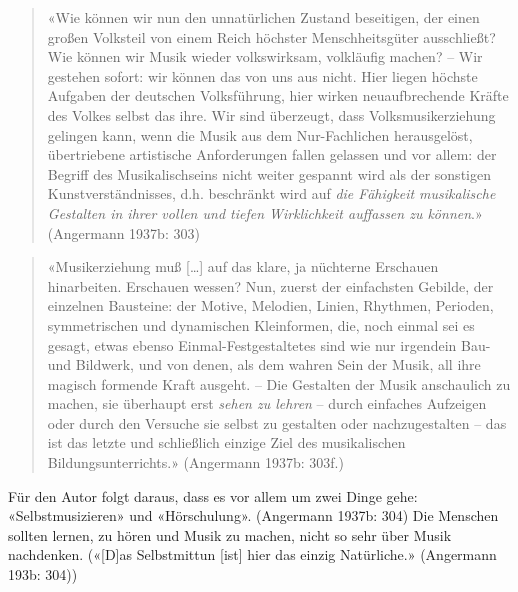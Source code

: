 \documentclass[a4paper,
fontsize=11pt,
oneside,
numbers=noperiodatend,
parskip=half-,
bibliography=totoc,
final
]{scrartcl}
\begin{document}
\begin{quote}
«Wie können wir nun den unnatürlichen Zustand beseitigen, der einen
großen Volksteil von einem Reich höchster Menschheitsgüter ausschließt?
Wie können wir Musik wieder volkswirksam, volkläufig machen? -- Wir
gestehen sofort: wir können das von uns aus nicht. Hier liegen höchste
Aufgaben der deutschen Volksführung, hier wirken neuaufbrechende Kräfte
des Volkes selbst das ihre. Wir sind überzeugt, dass Volksmusikerziehung
gelingen kann, wenn die Musik aus dem Nur-Fachlichen herausgelöst,
übertriebene artistische Anforderungen fallen gelassen und vor allem:
der Begriff des Musikalischseins nicht weiter gespannt wird als der
sonstigen Kunstverständnisses, d.h. beschränkt wird auf \emph{die
Fähigkeit musikalische Gestalten in ihrer vollen und tiefen Wirklichkeit
auffassen zu können}.» (Angermann 1937b: 303)
\end{quote}

\begin{quote}
«Musikerziehung muß {[}\ldots{]} auf das klare, ja nüchterne Erschauen
hinarbeiten. Erschauen wessen? Nun, zuerst der einfachsten Gebilde, der
einzelnen Bausteine: der Motive, Melodien, Linien, Rhythmen, Perioden,
symmetrischen und dynamischen Kleinformen, die, noch einmal sei es
gesagt, etwas ebenso Einmal-Festgestaltetes sind wie nur irgendein Bau-
und Bildwerk, und von denen, als dem wahren Sein der Musik, all ihre
magisch formende Kraft ausgeht. -- Die Gestalten der Musik anschaulich
zu machen, sie überhaupt erst \emph{sehen zu lehren} -- durch einfaches
Aufzeigen oder durch den Versuche sie selbst zu gestalten oder
nachzugestalten -- das ist das letzte und schließlich einzige Ziel des
musikalischen Bildungsunterrichts.» (Angermann 1937b: 303f.)
\end{quote}

Für den Autor folgt daraus, dass es vor allem um zwei Dinge gehe:
«Selbstmusizieren» und «Hörschulung». (Angermann 1937b: 304) Die
Menschen sollten lernen, zu hören und Musik zu machen, nicht so sehr
über Musik nachdenken. («{[}D{]}as Selbstmittun {[}ist{]} hier das
einzig Natürliche.» (Angermann 193b: 304))
\end{document}

